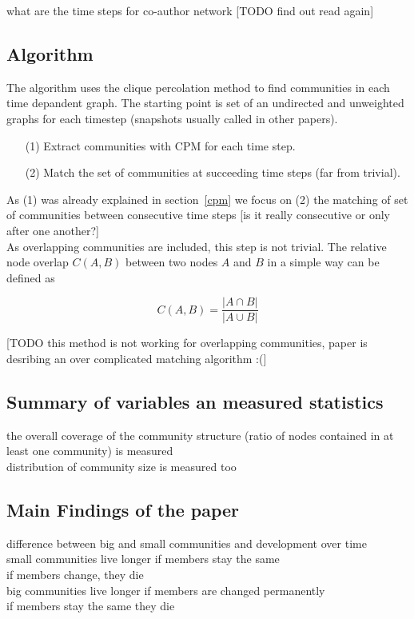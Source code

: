 \documentclass[runningheads,a4paper]{llncs}
\begin{document}
what are the time steps for co-author network [TODO find out read again]

\subsection{Algorithm}
The algorithm uses the clique percolation method to find communities in each time depandent graph. The starting point is set of an undirected and unweighted  graphs for each timestep (snapshots usually called in other papers).

\begin{enumerate}
\item[(1)] Extract communities with CPM for each time step.
\item[(2)] Match the set of communities at succeeding time steps (far from trivial). 
\end{enumerate}

As (1) was already explained in section~\ref{cpm} we focus on (2) the matching of set of communities between consecutive time steps [is it really consecutive or only after one another?]\\

As overlapping communities are included, this step is not trivial. The relative node overlap $C(A,B)$ between two nodes $A$ and $B$ in a simple way can be defined as

$$C(A,B) = \frac{ \left| A \cap B\right| }{\left| A \cup B\right|}$$

[TODO this method is not working for overlapping communities, paper is desribing an over complicated matching algorithm :(]


\subsection{Summary of variables an measured statistics}
the overall coverage of the community structure (ratio of nodes contained in at least one community) is measured\\
distribution of community size is measured too\\

\subsection{Main Findings of the paper}
difference between big and small communities and development over time\\
small communities live longer if members stay the same\\
if members change, they die\\
big communities live longer if members are changed permanently\\
if members stay the same they die\\
\end{document}
